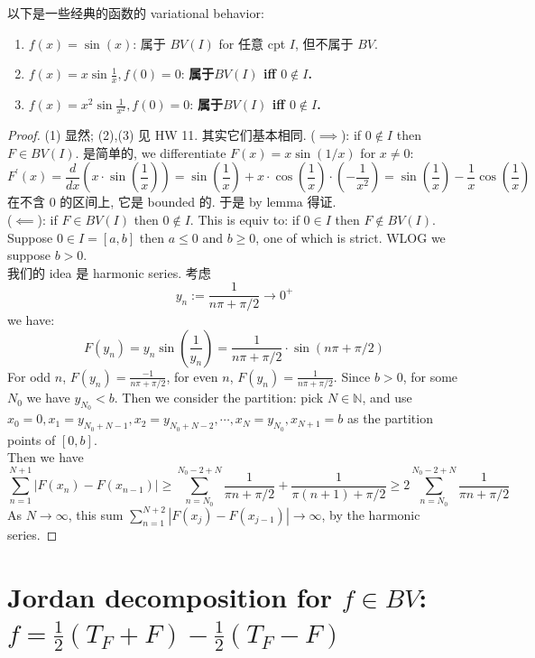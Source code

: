\documentclass[lang=cn,11pt]{elegantbook}
\begin{document}
\begin{proposition}
以下是一些经典的函数的 variational behavior: 
\begin{enumerate}
    \item $f(x) = \sin(x)$: 属于 $BV(I)$ for 任意 cpt $I$, 但不属于 $BV$.
    \item $f(x) = x\sin \frac{1}{x}, f(0) = 0$:  \textbf{属于$BV(I)$ iff $0\not\in I$.}
    \item $f(x) = x^2\sin \frac{1}{x^2}, f(0) = 0$:   \textbf{属于$BV(I)$ iff $0\not\in I$.}
\end{enumerate}
\end{proposition}
\begin{proof}
  (1) 显然;
  (2),(3) 见 HW 11. 其实它们基本相同. 
 ($\implies$): if $0 \not\in I$ then $F \in BV(I)$. 是简单的, we differentiate $F(x)=x \sin (1 / x)$ for $x \neq 0$:
$$
F^{\prime}(x)=\frac{d}{d x}\left(x \cdot \sin \left(\frac{1}{x}\right)\right)=\sin \left(\frac{1}{x}\right)+x \cdot \cos \left(\frac{1}{x}\right) \cdot\left(-\frac{1}{x^2}\right)=\sin \left(\frac{1}{x}\right)-\frac{1}{x} \cos \left(\frac{1}{x}\right)
$$
在不含 $0$ 的区间上, 它是 bounded 的. 于是 by lemma 得证.\\
($\impliedby$): if $F \in BV(I)$ then  $0 \not\in I$. This is equiv to: if $0 \in I $ then $F \not \in BV(I)$.\\
Suppose $0 \in I= [a,b] $ then $a \leq  0$ and $b \geq  0 $, one of which is strict. WLOG we suppose $b > 0$. \\
我们的 idea 是 harmonic series. 考虑
$$
y_n:=\frac{1}{n \pi+\pi / 2} \rightarrow 0^{+}
$$
we have:
$$
F\left(y_n\right)=y_n \sin \left(\frac{1}{y_n}\right)=\frac{1}{n \pi+\pi / 2} \cdot \sin (n \pi+\pi / 2)
$$For odd $n$, $F(y_n) = \frac{-1}{n \pi+\pi / 2}$, for even $n$, $F({y_n}) =  \frac{1}{n \pi+\pi / 2}$. Since $b > 0$, for some $N_0$ we have $y_{N_0} < b$. Then we consider the partition: pick $N \in \mathbb{N}$, and use $ x_0 = 0,x_1 = y_{N_0 + N-1},x_2 =y_{N_0 +N-2},\cdots, x_{N} = y_{N_0},x_{N+1} = b$ as the partition points of $[0,b]$.\\
Then we have \[
\sum_{n=1}^{N+1} |F (x_n) - F(x_{n-1}) | \geq  \sum_{n=N_0}^{N_0 -2+ N}  \frac{1}{\pi n+\pi / 2} + \frac{1}{\pi (n+1)+\pi / 2} \geq 2\sum_{n=N_0}^{N_0 -2+ N} \frac{1}{\pi n+\pi / 2}
\]
As $N \to \infty$, this sum $\sum_{n=1}^{N+2} |F (x_j) - F(x_{j-1}) |  \to \infty$, by the harmonic series.
\end{proof}



\section{Jordan decomposition for $f\in BV$: $f = \frac{1}{2}(T_F+F) - \frac{1}{2}(T_F-F)$}
\end{document}
